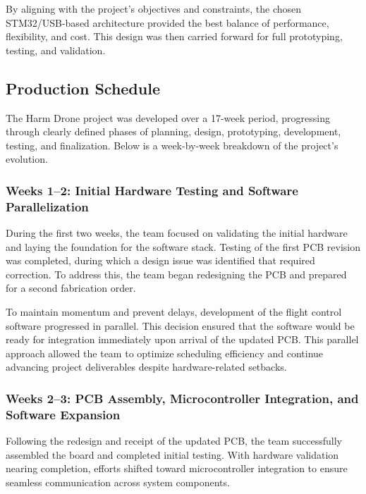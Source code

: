 \documentclass[12pt]{article}
\begin{document}
By aligning with the project's objectives and constraints, the chosen STM32/USB-based architecture provided the best balance of performance, flexibility, and cost. This design was then carried forward for full prototyping, testing, and validation.

\subsection{Production Schedule}

The Harm Drone project was developed over a 17-week period, progressing through clearly defined phases of planning, design, prototyping, development, testing, and finalization. Below is a week-by-week breakdown of the project's evolution.

\subsubsection*{Weeks 1–2: Initial Hardware Testing and Software Parallelization}

During the first two weeks, the team focused on validating the initial hardware and laying the foundation for the software stack. Testing of the first PCB revision was completed, during which a design issue was identified that required correction. To address this, the team began redesigning the PCB and prepared for a second fabrication order.

To maintain momentum and prevent delays, development of the flight control software progressed in parallel. This decision ensured that the software would be ready for integration immediately upon arrival of the updated PCB. This parallel approach allowed the team to optimize scheduling efficiency and continue advancing project deliverables despite hardware-related setbacks.

\subsubsection*{Weeks 2–3: PCB Assembly, Microcontroller Integration, and Software Expansion}

Following the redesign and receipt of the updated PCB, the team successfully assembled the board and completed initial testing. With hardware validation nearing completion, efforts shifted toward microcontroller integration to ensure seamless communication across system components.
\end{document}
